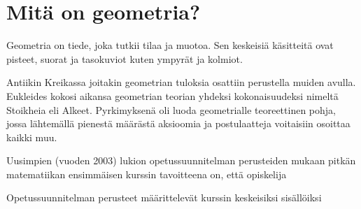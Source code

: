 \section*{Mitä on geometria?}

Geometria on tiede, joka tutkii tilaa ja muotoa. Sen keskeisiä käsitteitä ovat pisteet, suorat ja tasokuviot kuten ympyrät ja kolmiot. 

Antiikin Kreikassa joitakin geometrian tuloksia osattiin perustella muiden avulla. Eukleides kokosi aikansa geometrian teorian yhdeksi kokonaisuudeksi nimeltä Stoikheia eli Alkeet. Pyrkimyksenä oli luoda geometrialle teoreettinen pohja, jossa lähtemällä pienestä määrästä aksioomia ja postulaatteja voitaisiin osoittaa kaikki muu.

Uusimpien (vuoden 2003) lukion opetussuunnitelman perusteiden mukaan pitkän matematiikan ensimmäisen kurssin tavoitteena on, että opiskelija

Opetussuunnitelman perusteet määrittelevät kurssin keskeisiksi sisällöiksi
